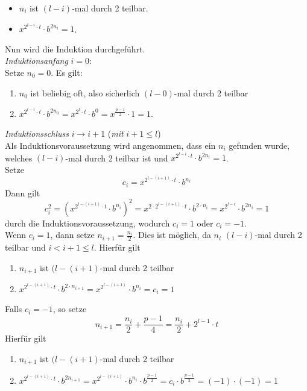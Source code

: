 \begin{itemize}
\item $n_i$ ist $(l - i)$-mal durch 2 teilbar.
\item $x^{2^{l - i} \cdot t} \cdot b^{2n_i} = 1$.
\end{itemize}

Nun wird die Induktion durchgeführt.\\

\textit{Induktionsanfang} $i = 0$:\\Setze $n_0 = 0$. Es gilt:

\begin{enumerate}
\item $n_0$ ist beliebig oft, also sicherlich $(l - 0)$-mal durch 2 teilbar
\item $x^{2^{l - i} \cdot t} \cdot b^{2n_0} = x^{2^{l} \cdot t} \cdot b^0 = x^{\frac{p - 1}{2}} \cdot 1 = 1$.
\end{enumerate}

\textit{Induktionsschluss} $i \rightarrow i + 1$ (\textit{mit} $i + 1 \leq l$)\\Als Induktionsvoraussetzung wird angenommen, dass ein $n_i$ gefunden wurde, welches $(l - i)$-mal durch 2 teilbar ist und $x^{2^{l - i} \cdot t} \cdot b^{2n_i} = 1$.\\Setze $$c_i = x^{2^{l - (i + 1)} \cdot t} \cdot b^{n_i}$$ Dann gilt $$c^2_i = {(x^{2^{l - (i + 1)} \cdot t} \cdot b^{n_i})}^2 = x^{2 \cdot 2^{l - (i + 1)} \cdot t} \cdot b^{2 \cdot n_i} = x^{2^{l - i}} \cdot b^{2n_i} = 1$$ durch die Induktionsvoraussetzung, wodurch $c_i = 1$ oder $c_i = - 1$.\\Wenn $c_i = 1$, dann setze $n_{i + 1} = \frac{n_i}{2}$. Dies ist möglich, da $n_i$ $(l - i)$-mal durch 2 teilbar und $i < i + 1 \leq l$. Hierfür gilt

\begin{enumerate}
\item $n_{i + 1}$ ist $(l - (i + 1)$-mal durch 2 teilbar
\item $x^{2^{l - (i + 1)} \cdot t} \cdot b^{2 \cdot n_{i + 1}} = x^{2^{l - (i + 1)}} \cdot b^{n_i} = c_i = 1$
\end{enumerate}

Falls $c_i = - 1$, so setze $$n_{i + 1} = \frac{n_i}{2} + \frac{p - 1}{4} = \frac{n_i}{2} + 2^{l - 1} \cdot t$$ Hierfür gilt 

\begin{enumerate}
\item $n_{i + 1}$ ist $(l - (i + 1)$-mal durch 2 teilbar
\item $x^{2^{l - (i + 1)} \cdot t} \cdot b^{2n_{i + 1}} = x^{2^{l - (i + 1)}} \cdot b^{n_i} \cdot b^{\frac{p - 1}{2}}= c_i \cdot b^{\frac{p - 1}{2}} = (- 1) \cdot (- 1) = 1$
\end{enumerate}

